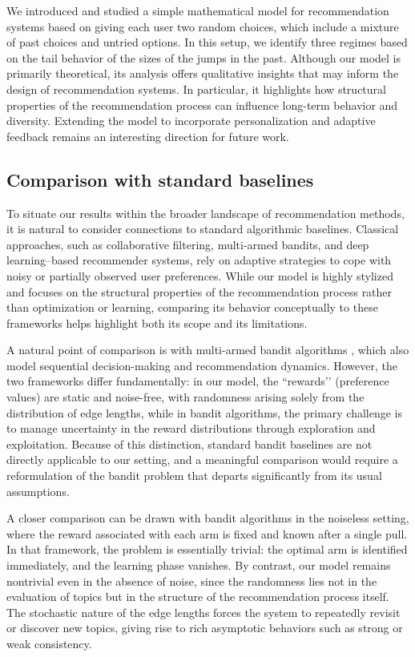 \documentclass[12pt]{article}
\numberwithin{equation}{section} \font\titre=cmbx12
\begin{document}
We introduced and studied a simple mathematical model for
recommendation systems based on giving each user two random choices,
which include a mixture of past choices and untried options.  In this
setup, we identify three regimes based on the tail behavior of the
sizes of the jumps in the past.
\color{black}
Although our model is primarily theoretical, its analysis offers qualitative insights that may inform the design of recommendation systems. In particular, it highlights how structural properties of the recommendation process can influence long-term behavior and diversity. Extending the model to incorporate personalization and adaptive feedback remains an interesting direction for future work.


\subsection{Comparison with standard baselines}


To situate our results within the broader landscape of recommendation methods, it is natural to consider connections to standard algorithmic baselines. Classical approaches, such as collaborative filtering, multi-armed bandits, and deep learning–based recommender systems, rely on adaptive strategies to cope with noisy or partially observed user preferences. While our model is highly stylized and focuses on the structural properties of the recommendation process rather than optimization or learning, comparing its behavior conceptually to these frameworks helps highlight both its scope and its limitations.

A natural point of comparison is with multi-armed bandit algorithms \cite{LaSz20, BuCe12}, which also model sequential decision-making and recommendation dynamics. However, the two frameworks differ fundamentally: in our model, the “rewards’’ (preference values) are static and noise-free, with randomness arising solely from the distribution of edge lengths, while in bandit algorithms, the primary challenge is to manage uncertainty in the reward distributions through exploration and exploitation. Because of this distinction, standard bandit baselines are not directly applicable to our setting, and a meaningful comparison would require a reformulation of the bandit problem that departs significantly from its usual assumptions.

A closer comparison can be drawn with bandit algorithms in the noiseless setting, where the reward associated with each arm is fixed and known after a single pull. In that framework, the problem is essentially trivial: the optimal arm is identified immediately, and the learning phase vanishes. By contrast, our model remains nontrivial even in the absence of noise, since the randomness lies not in the evaluation of topics but in the structure of the recommendation process itself. The stochastic nature of the edge lengths forces the system to repeatedly revisit or discover new topics, giving rise to rich asymptotic behaviors such as strong or weak consistency.
\end{document}
